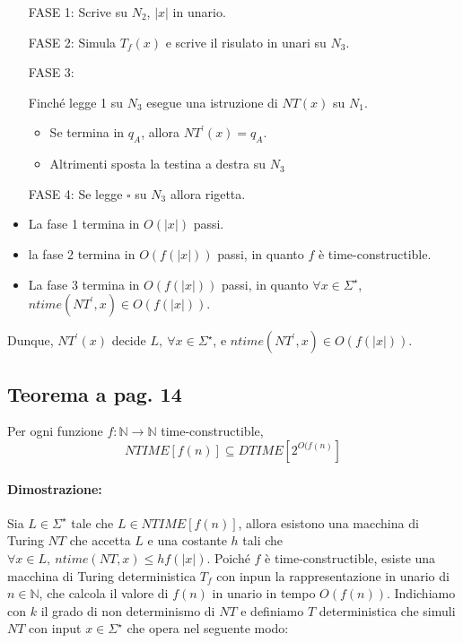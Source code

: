 \begin{itemize}
    \item [FASE 1:] Scrive su $N_{2}$, $|x|$ in unario. 
    \item [FASE 2:] Simula $T_{f}(x)$ e scrive il risulato in unari su $N_{3}$.
    \item [FASE 3:] {
        Finché legge 1 su $N_{3}$ esegue una istruzione di $NT(x)$ su $N_{1}$. 
        \begin{itemize}
            \item Se termina in $q_{A}$, allora $NT^{'}(x) = q_{A}$.
            \item Altrimenti sposta la testina a destra su $N_{3}$
        \end{itemize}
    }
    \item [FASE 4:] Se legge $\square$ su $N_{3}$ allora rigetta.
\end{itemize}

\begin{itemize}
    \item La fase 1 termina in $O(|x|)$ passi.
    \item la fase 2 termina in $O(f(|x|))$ passi, in quanto $f$ è time-constructible.
    \item La fase 3 termina in $O(f(|x|))$ passi, in quanto $\forall x \in \Sigma^{\star}$, $ntime(NT^{'}, x) \in O(f(|x|))$.
\end{itemize}

Dunque, $NT^{'}(x)$ decide $L,\ \forall x \in \Sigma^{\star}$, e $ntime(NT^{'}, x) \in O(f(|x|))$. 

\subsection{Teorema a pag. 14}

Per ogni funzione $f: \mathbb{N} \rightarrow \mathbb{N}$ time-constructible, $$NTIME[f(n)] \subseteq DTIME[2^{O(f(n)}]$$

\paragraph*{Dimostrazione:} 

Sia $L \in \Sigma^{\star}$ tale che $L \in NTIME[f(n)]$, allora esistono una macchina di Turing $NT$ che accetta $L$ e una 
costante $h$ tali che $\forall x \in L,\ ntime(NT, x) \leq hf(|x|)$. Poiché $f$ è time-constructible, esiste una macchina 
di Turing deterministica $T_{f}$ con inpun la rappresentazione in unario di $n \in \mathbb{N}$, che calcola il valore di 
$f(n)$ in unario in tempo $O(f(n))$. Indichiamo con $k$ il grado di non determinismo di $NT$ e definiamo $T$ deterministica
che simuli $NT$ con input $x \in \Sigma^{\star}$ che opera nel seguente modo:

